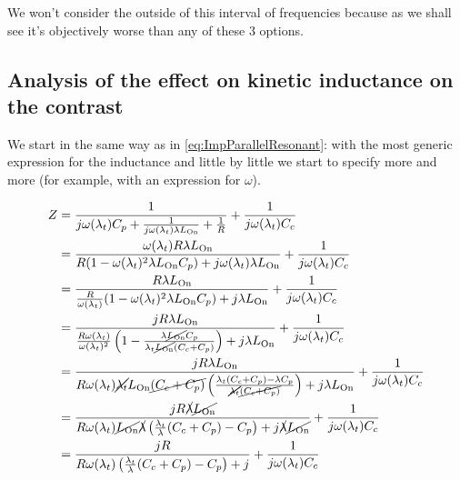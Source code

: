 \documentclass[../main.tex]{subfiles}
\begin{document}
We won't consider the outside of this interval of frequencies because as we
shall see it's objectively worse than any of these 3 options.

\subsection{Analysis of the effect on kinetic inductance on the contrast}
We start in the same way as in \ref{eq:ImpParallelResonant}: with the most generic
expression for the inductance and little by little we start to specify more
and more (for example, with an expression for \(\omega\)).

\begin{align}
\label{eq:ImpKineticResonant}
\begin{split}
    Z &= \frac{1}{j \omega(\lambda_{t}) C_{p} + \frac{1}{j \omega(\lambda_{t}) \lambda L_{\text{On}}} + \frac{1}{R}}
        + \frac{1}{j \omega(\lambda_{t}) C_{c}}\\
      &= \frac{\omega(\lambda_{t}) R \lambda L_{\text{On}}}{R(1 - \omega(\lambda_{t})^2 \lambda L_{\text{On}} C_{p}) + j \omega(\lambda_{t}) \lambda L_{\text{On}}}
        + \frac{1}{j \omega(\lambda_{t}) C_{c}}\\
      &= \frac{R \lambda L_{\text{On}}}{\frac{R}{\omega(\lambda_{t})}(1 - \omega(\lambda_{t})^2 \lambda L_{\text{On}} C_{p}) + j \lambda L_{\text{On}}}
        + \frac{1}{j \omega(\lambda_{t}) C_{c}}\\
      &= \frac{j R \lambda L_{\text{On}}}{
          \frac{R\omega(\lambda_{t})}{\omega(\lambda_{t})^2}\left(1 - \frac{\lambda\cancel{L_{\text{On}}} C_{p}}{\lambda_{t}\cancel{L_{\text{On}}}(C_{c} + C_{p})}\right)
            + j \lambda L_{\text{On}}} + \frac{1}{j \omega(\lambda_{t})C_{c}}\\
      &= \frac{j R \lambda L_{\text{On}}}{
          R\omega(\lambda_{t})\cancel{\lambda_{t}}L_{\text{On}}\cancel{(C_{c} + C_{p})}
          \left(\frac{\lambda_{t}(C_{c} + C_{p}) - \lambda C_{p}}{\cancel{\lambda_{t}}\cancel{(C_{c} + C_{p})}}\right)
            + j \lambda L_{\text{On}}} + \frac{1}{j \omega(\lambda_{t})C_{c}}\\
      &= \frac{j R \cancel{\lambda}\cancel{L_{\text{On}}}}{
          R\omega(\lambda_{t})\cancel{L_{\text{On}}}\cancel{\lambda}
          \left(\frac{\lambda_{t}}{\lambda}(C_{c} + C_{p}) - C_{p}\right)
          + j \cancel{\lambda}\cancel{L_{\text{On}}}} + \frac{1}{j \omega(\lambda_{t})C_{c}}\\
      &= \frac{j R }{
          R\omega(\lambda_{t})
          \left(\frac{\lambda_{t}}{\lambda}(C_{c} + C_{p}) - C_{p}\right)
          + j } + \frac{1}{j \omega(\lambda_{t})C_{c}}\\
\end{split}
\end{align}
\end{document}
